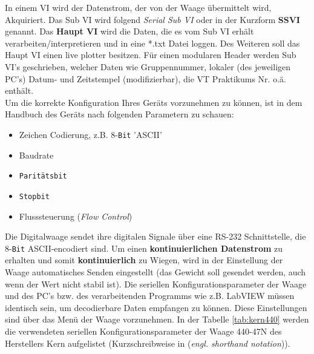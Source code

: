 \noindent In einem VI wird der Datenstrom, der von der Waage übermittelt wird, Akquiriert. Das Sub VI wird folgend \textit{Serial Sub VI} oder in der Kurzform \textbf{SSVI} genannt. Das \textbf{Haupt VI} wird die Daten, die es vom Sub VI erhält verarbeiten/interpretieren und in eine *.txt Datei loggen. Des Weiteren soll das Haupt VI einen live plotter besitzen. Für einen modularen Header werden Sub VI's geschrieben, welcher Daten wie Gruppennummer, lokaler (des jeweiligen PC's) Datum- und Zeitstempel (modifizierbar), die VT Praktikums Nr. o.ä. enthält.\\

\noindent Um die korrekte Konfiguration Ihres Geräts vorzunehmen zu können, ist in dem Handbuch des Geräts nach folgenden Parametern zu schauen:

\begin{itemize} %
\singlespacing
\item Zeichen Codierung, z.B. 8-\texttt{Bit} 'ASCII'
\item Baudrate
\item \texttt{Paritätsbit}
\item \texttt{Stopbit}
\item Flusssteuerung (\textit{Flow Control})
\end{itemize}

\noindent Die Digitalwaage sendet ihre digitalen Signale über eine RS-232 Schnittstelle, die 8-\texttt{Bit} ASCII-encodiert sind. Um einen \textbf{kontinuierlichen Datenstrom} zu erhalten und somit \textbf{kontinuierlich} zu Wiegen, wird in der Einstellung der Waage \glqq automatisches Senden\grqq{} eingestellt (das Gewicht soll gesendet werden, auch wenn der Wert nicht stabil ist). Die seriellen Konfigurationsparameter der Waage und des PC's bzw. des verarbeitenden Programms wie z.B. LabVIEW müssen identisch sein, um decodierbare Daten empfangen zu können. Diese Einstellungen sind über das Menü der Waage vorzunehmen. In der Tabelle \ref{tab:kern440} werden die verwendeten seriellen Konfigurationsparameter der Waage 440-47N des Herstellers Kern aufgelistet (Kurzschreibweise in  (\textit{engl. shorthand notation})).

